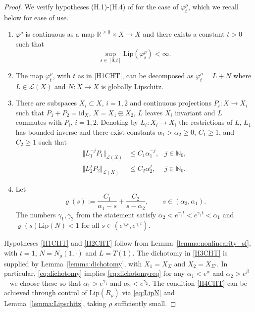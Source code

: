 \documentclass[a4paper, 12pt, oneside, reqno, notitlepage]{amsart}
\theoremstyle{plain}
\theoremstyle{definition}
\theoremstyle{remark}
\newcommand{\lip}{\mathrm{Lip}}
\begin{document}
\begin{proof}
We verify hypotheses (H.1)-(H.4) of \cite{chen1997invariant}
for the case of 
$\varphi_t^\rho$, which we recall below for ease of use.
\begin{enumerate}[label =(H.\arabic*)]
  \item \label{H1CHT} $\varphi^\rho$ is continuous as a map  $\mathbb{R}^{\geq0} \times X \to X$ and there exists a constant $t > 0$ such that 
  \begin{displaymath}
    \sup_{s \in [0,t]} \mathrm{Lip} ( \varphi_s^\rho ) <\infty.
  \end{displaymath}
  
  \item \label{H2CHT} The map $\varphi_t^\rho$, with $t$ as in \ref{H1CHT}, can be decomposed as $\varphi_t^\rho = L + N$ where $L \in \mathcal{L}(X)$ and $N: X \to X$ is globally Lipschitz. 
  
  \item \label{H3CHT} There are subspaces $X_i \subset X$, $i =1,2$ and continuous projections $P_i : X \to X_i$ such that $P_1 + P_2 = \mathrm{id}_X$, $X = X_1 \oplus X_2$, $L$ leaves $X_i$ invariant and $L$ commutes with $P_i$, $i = 1,2$. 
  Denoting by $L_i:X_i \to X_i$ the restrictions of $L$, $L_1$ has bounded inverse and there exist constants $\alpha_1  > \alpha_2 \geq 0$, $C_1 \geq 1$, and $C_2 \geq 1$ such that
  \begin{subequations} \label{eq:dichotomyreq}
  \begin{align}
      \Vert L_1^{-j} P_1\Vert_{\mathcal{L}(X)} &\leq C_1 \alpha_1^{-j},  &j \in \mathbb{N}_0, \\
      \Vert L_2^{j} P_2\Vert_{\mathcal{L}(X)} &\leq C_2 \alpha_2^{j},   &j \in \mathbb{N}_0.
  \end{align}
  \end{subequations}

  \item \label{H4CHT} 
  Let 
  \begin{equation}
      \varrho(s):= \frac{C_1}{\alpha_1 - s} + \frac{C_2}{s-\alpha_2}, \qquad s \in (\alpha_2,\alpha_1).
      \label{eq:varrho}
  \end{equation}
  The numbers $\gamma_1,\gamma_2$ from the statement satisfy $\alpha_2 <e^{\gamma_2 t}<e^{\gamma_1 t} < \alpha_1$ and $\varrho(s) \lip(N) < 1$ for all $s \in (e^{\gamma_2 t},e^{\gamma_1 t})$.
\end{enumerate}

Hypotheses \ref{H1CHT} and \ref{H2CHT} follow from Lemma~\ref{lemma:nonlinearity_sf}, with $t =1$, $N = N_\rho(1,\cdot)$ and $L = T(1)$. 
The dichotomy in \ref{H3CHT} is supplied by Lemma~\ref{lemma:dichotomy}, with $X_1 = X_\Sigma$ and $X_2 = X_{\Sigma'}$.
In particular, \eqref{eq:dichotomy} implies \eqref{eq:dichotomyreq} for any $\alpha_1 < e^\alpha$ and $\alpha_2 > e^\beta$ -- we choose these so that $\alpha_1 > e^{\gamma_1}$ and $\alpha_2 < e^{\gamma_2}$.
The condition \ref{H4CHT} can be achieved through control of $\lip(R_\rho)$ via \eqref{eq:LipN} and Lemma~\ref{lemma:Lipschitz}, taking $\rho$ sufficiently small.




\end{proof}
\end{document}

